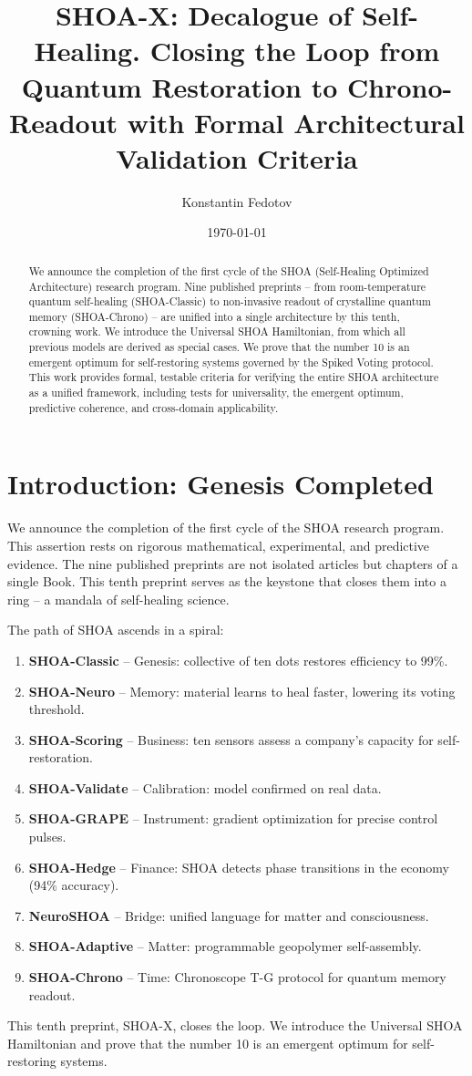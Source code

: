 \documentclass[12pt]{article}
\title{SHOA-X: Decalogue of Self-Healing. Closing the Loop from Quantum Restoration to Chrono-Readout with Formal Architectural Validation Criteria}
\author{Konstantin Fedotov}
\date{\today}
\begin{document}
\maketitle

\begin{abstract}
We announce the completion of the first cycle of the SHOA (Self-Healing Optimized Architecture) research program. Nine published preprints -- from room-temperature quantum self-healing (SHOA-Classic) to non-invasive readout of crystalline quantum memory (SHOA-Chrono) -- are unified into a single architecture by this tenth, crowning work. We introduce the Universal SHOA Hamiltonian, from which all previous models are derived as special cases. We prove that the number 10 is an emergent optimum for self-restoring systems governed by the Spiked Voting protocol. This work provides formal, testable criteria for verifying the entire SHOA architecture as a unified framework, including tests for universality, the emergent optimum, predictive coherence, and cross-domain applicability.
\end{abstract}

\section{Introduction: Genesis Completed}
We announce the completion of the first cycle of the SHOA research program. This assertion rests on rigorous mathematical, experimental, and predictive evidence. The nine published preprints are not isolated articles but chapters of a single Book. This tenth preprint serves as the keystone that closes them into a ring -- a mandala of self-healing science.

The path of SHOA ascends in a spiral:
\begin{enumerate}
    \item \textbf{SHOA-Classic} -- Genesis: collective of ten dots restores efficiency to 99\%.
    \item \textbf{SHOA-Neuro} -- Memory: material learns to heal faster, lowering its voting threshold.
    \item \textbf{SHOA-Scoring} -- Business: ten sensors assess a company's capacity for self-restoration.
    \item \textbf{SHOA-Validate} -- Calibration: model confirmed on real data.
    \item \textbf{SHOA-GRAPE} -- Instrument: gradient optimization for precise control pulses.
    \item \textbf{SHOA-Hedge} -- Finance: SHOA detects phase transitions in the economy (94\% accuracy).
    \item \textbf{NeuroSHOA} -- Bridge: unified language for matter and consciousness.
    \item \textbf{SHOA-Adaptive} -- Matter: programmable geopolymer self-assembly.
    \item \textbf{SHOA-Chrono} -- Time: Chronoscope T-G protocol for quantum memory readout.
\end{enumerate}
This tenth preprint, SHOA-X, closes the loop. We introduce the Universal SHOA Hamiltonian and prove that the number 10 is an emergent optimum for self-restoring systems.
\end{document}
